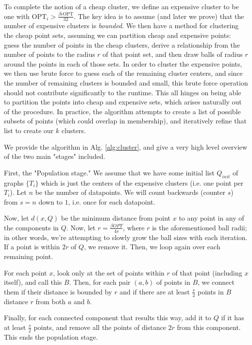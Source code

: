 \documentclass[paper=a4, fontsize=10.5pt]{scrartcl} %
\numberwithin{equation}{section} %
\numberwithin{figure}{section} %
\numberwithin{table}{section} %
\begin{document}
To complete the notion of a cheap cluster, we define an expensive cluster to be one with $\text{OPT}_i > \frac{\beta\epsilon\text{OPT}}{32}$. The key idea is to assume (and later we prove) that the number of expensive clusters is \emph{bounded}.  We then have a method for clustering the cheap point sets, assuming we can partition cheap and expensive points: guess the number of points in the cheap clusters, derive a relationship from the number of points to the radius $r$ of that point set, and then draw balls of radius $r$ around the points in each of those sets.  In order to cluster the expensive points, we then use brute force to guess each of the remaining cluster centers, and since the number of remaining clusters is bounded and small, this brute force operation should not contribute significantly to the runtime.  This all hinges on being able to partition the points into cheap and expensive sets, which arises naturally out of the procedure.  In practice, the algorithm attempts to create a list of possible subsets of points (which could overlap in membership), and iteratively refine that list to create our $k$ clusters. 



We provide the algorithm in Alg. \ref{alg:cluster}, and give a very high level overview of the two main "stages" included.

First, the "Population stage."  We assume that we have some initial list $Q_{init}$ of graphs $\{T_i\}$ which is just the centers of the expensive clusters (i.e. one point per $T_i$).  Let $n$ be the number of datapoints.  We will count backwards (counter $s$) from $s=n$ down to $1$, i.e. once for each datapoint.

Now, let $d(x, Q)$ be the minimum distance from point $x$ to any point in any of the components in $Q$.  Now, let $r = \frac{\beta OPT}{4 s}$, where $r$ is the aforementioned ball radii; in other words, we're attempting to slowly grow the ball sizes with each iteration.  If a point is within $2r$ of $Q$, we remove it. Then, we loop again over each remaining point.

For each point $x$, look only at the set of points within $r$ of that point (including $x$ itself), and call this $B$.  Then, for each pair $(a, b)$ of points in $B$, we connect them if their distance is bounded by $r$ and if there are at least $\frac{s}{2}$ points in $B$ distance $r$ from both $a$ and $b$.

Finally, for each connected component that results this way, add it to $Q$ if it has at least $\frac{s}{2}$ points, and remove all the points of distance $2r$ from this component.  This ends the population stage.
\end{document}
